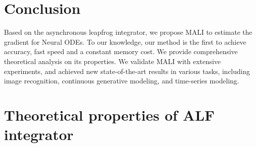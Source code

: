 \documentclass{article} \usepackage{iclr2021_conference,times}
\newcommand\StartAppendixEntries{}
\newcommand*\appendixwithtoc{\cleardoublepage
  \appendix
  \addtocontents{toc}{\protect\StartAppendixEntries}
  \listofatoc
}
\begin{document}
\begin{table}[]
\caption{\small{Bits per dim (BPD) of generative models, \textit{lower} is better. Results marked with superscript numbers correspond to literature in the footnote.}}
\label{table:ffjord}
\vspace{-1mm}
\vspace{-3mm}
\end{table}
\vspace{-2mm}
\section{Conclusion}
\vspace{-2mm}
Based on the asynchronous leapfrog integrator, we propose MALI to estimate the gradient for Neural ODEs. To our knowledge, our method is the first to achieve accuracy, fast speed and a constant memory cost. We provide comprehensive theoretical analysis on its properties. We validate MALI with extensive experiments, and achieved new state-of-the-art results in various tasks, including image recognition, continuous generative modeling, and time-series modeling.
\newpage



\newpage
\appendixwithtoc
\newpage
\setcounter{equation}{0}
\setcounter{figure}{0}
\setcounter{theorem}{0}
\setcounter{corollary}{0}
\setcounter{lemma}{0}
\setcounter{algocf}{0}


\section{Theoretical properties of ALF integrator}
\label{sup:sec:theory}
\end{document}
